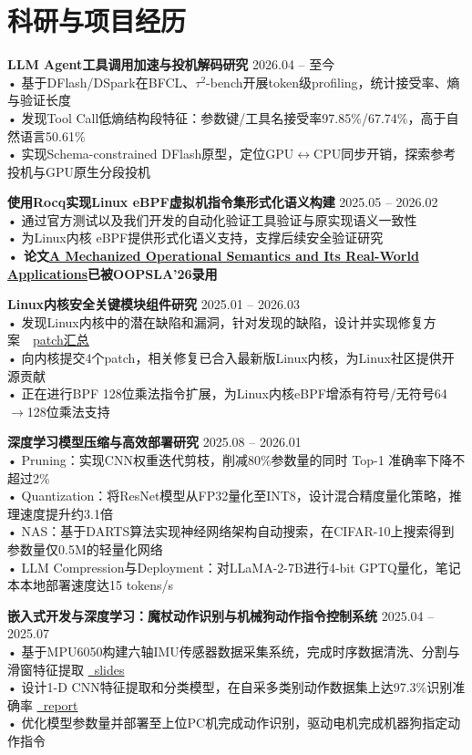 \documentclass[11pt]{article}
\newlength{\interProjectSpacing}
\newcommand{\projectsep}{\vspace{\interProjectSpacing}}
\newlength{\intraProjectTitleSep}
\newcommand{\titlebreak}{\\[\intraProjectTitleSep]}
\begin{document}
\section{科研与项目经历}

\textbf{LLM Agent工具调用加速与投机解码研究} \hfill 2026.04 -- 至今 \titlebreak
• 基于DFlash/DSpark在BFCL、$\tau^2$-bench开展token级profiling，统计接受率、熵与验证长度\\
• 发现Tool Call低熵结构段特征：参数键/工具名接受率97.85\%/67.74\%，高于自然语言50.61\%\\
• 实现Schema-constrained DFlash原型，定位GPU$\leftrightarrow$CPU同步开销，探索参考投机与GPU原生分段投机

\projectsep

\textbf{使用Rocq实现Linux eBPF虚拟机指令集形式化语义构建} \hfill 2025.05 -- 2026.02 \titlebreak
• 通过官方测试以及我们开发的自动化验证工具验证与原实现语义一致性\\
• 为Linux内核 eBPF提供形式化语义支持，支撑后续安全验证研究\\
\textbf{• 论文\href{https://doi.org/10.1145/3839449}{A Mechanized Operational Semantics and Its Real-World Applications}已被OOPSLA'26录用}

\projectsep

\textbf{Linux内核安全关键模块组件研究} \hfill 2025.01 -- 2026.03 \titlebreak
• 发现Linux内核中的潜在缺陷和漏洞，针对发现的缺陷，设计并实现修复方案\ \hfill \faGithub\  \href{https://ziyefbk.github.io/portfolio/2025-01-01-linux-kernel-security/}{patch汇总}\\
• 向内核提交4个patch，相关修复已合入最新版Linux内核，为Linux社区提供开源贡献\\
• 正在进行BPF 128位乘法指令扩展，为Linux内核eBPF增添有符号/无符号64$\to$128位乘法支持

\projectsep

\textbf{深度学习模型压缩与高效部署研究} \hfill 2025.08 -- 2026.01 \titlebreak
• Pruning：实现CNN权重迭代剪枝，削减80\%参数量的同时 Top-1 准确率下降不超过2\%\\
• Quantization：将ResNet模型从FP32量化至INT8，设计混合精度量化策略，推理速度提升约3.1倍\\
• NAS：基于DARTS算法实现神经网络架构自动搜索，在CIFAR-10上搜索得到参数量仅0.5M的轻量化网络\\
• LLM Compression与Deployment：对LLaMA-2-7B进行4-bit GPTQ量化，笔记本本地部署速度达15 tokens/s

\projectsep

\textbf{嵌入式开发与深度学习：魔杖动作识别与机械狗动作指令控制系统} \hfill 2025.04 -- 2025.07 \titlebreak
• 基于MPU6050构建六轴IMU传感器数据采集系统，完成时序数据清洗、分割与滑窗特征提取 \hfill \href{https://ziyefbk.github.io/files/slide.pptx}{\faDesktop\ slides} \\
• 设计1-D CNN特征提取和分类模型，在自采多类别动作数据集上达97.3\%识别准确率  \hfill \href{https://ziyefbk.github.io/files/report.pdf}{\faFileText\ report} \\
• 优化模型参数量并部署至上位PC机完成动作识别，驱动电机完成机器狗指定动作指令
\end{document}
